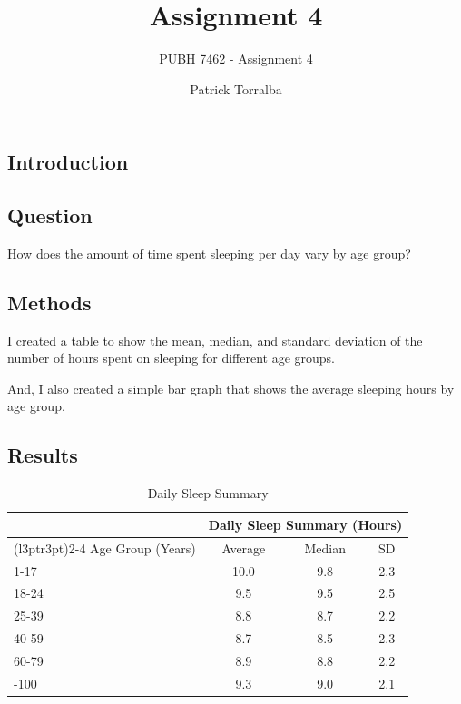 \documentclass[
  letterpaper,
  DIV=11,
  numbers=noendperiod]{scrartcl}
\title{Assignment 4}
\subtitle{PUBH 7462 - Assignment 4}
\author{Patrick Torralba}
\date{}
\begin{document}
\maketitle


\subsection{Introduction}\label{introduction}

\subsection{Question}\label{question}

How does the amount of time spent sleeping per day vary by age group?

\subsection{Methods}\label{methods}

I created a table to show the mean, median, and standard deviation of
the number of hours spent on sleeping for different age groups.

And, I also created a simple bar graph that shows the average sleeping
hours by age group.

\subsection{Results}\label{results}

\begin{longtable}[t]{lccc}

\caption{\label{tbl-sleep}Daily Sleep Summary}

\tabularnewline

\toprule
\multicolumn{1}{c}{ } & \multicolumn{3}{c}{Daily Sleep Summary (Hours)} \\
\cmidrule(l{3pt}r{3pt}){2-4}
Age Group (Years) & Average & Median & SD\\
\midrule
1-17 & 10.0 & 9.8 & 2.3\\
18-24 & 9.5 & 9.5 & 2.5\\
25-39 & 8.8 & 8.7 & 2.2\\
40-59 & 8.7 & 8.5 & 2.3\\
60-79 & 8.9 & 8.8 & 2.2\\
\addlinespace
80-100 & 9.3 & 9.0 & 2.1\\
\bottomrule

\end{longtable}
\end{document}
